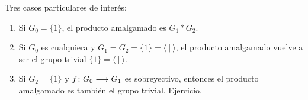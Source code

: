 \documentclass[GTSResumen.tex]{subfiles}
\begin{document}
\begin{ej} Tres casos particulares de interés:
\begin{enumerate}
\item Si $G_0=\{1\}$, el producto amalgamado es $G_1*G_2$.
\item Si $G_0$ es cualquiera y $G_1=G_2=\{1\}=\langle\ |\ \rangle$, el producto amalgamado vuelve a ser el grupo trivial $\{1\}=\langle\ |\ \rangle$.
\item Si $G_2=\{1\}$ y $f\colon{G_0}\longrightarrow{G_1}$ es sobreyectivo, entonces el producto amalgamado es también el grupo trivial. Ejercicio.
\end{enumerate}

\end{ej}

\end{document}
